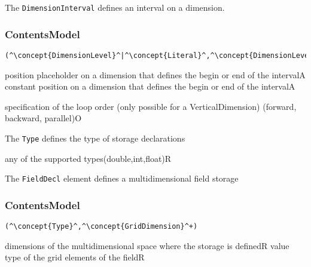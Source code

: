 
The {\tt DimensionInterval} defines an interval on a dimension.

\subsubsection*{ContentsModel}{}

\begin{lstlisting}[style=default,frame=none]
(^\concept{DimensionLevel}^|^\concept{Literal}^,^\concept{DimensionLevel}^|^\concept{Literal}^)
\end{lstlisting}

\begin{HIRChildElements}
	{position placeholder on a dimension that defines the begin or end of the interval}{A}
	{constant position on a dimension that defines the begin or end of the interval}{A}
\end{HIRChildElements}

\begin{HIRAttributesVal}
	{specification of the loop order (only possible for a VerticalDimension) }{(forward, backward, parallel)}{O}
\end{HIRAttributesVal}


The {\tt Type} defines the type of storage declarations
\HIRContentsModel{ () }

\begin{HIRAttributesVal}
	{any of the supported types}{(double,int,float)}{R}
\end{HIRAttributesVal}

The {\tt FieldDecl} element defines a multidimensional field storage
\subsubsection*{ContentsModel}{}

\begin{lstlisting}[style=default,frame=none]
(^\concept{Type}^,^\concept{GridDimension}^+)
\end{lstlisting}

\begin{HIRChildElements}
	{dimensions of the multidimensional space where the storage is defined}{R}
	{value type of the grid elements of the field}{R}
\end{HIRChildElements}

